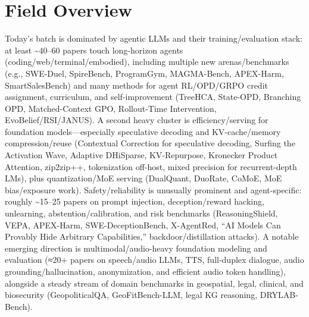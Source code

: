 \documentclass[12pt,letterpaper]{article}
\begin{document}
\section*{Field Overview}
{\footnotesize Today's batch is dominated by agentic LLMs and their training/evaluation stack: at least \textasciitilde{}40--60 papers touch long-horizon agents (coding/web/terminal/embodied), including multiple new arenas/benchmarks (e.g., SWE-Duel, SpireBench, ProgramGym, MAGMA-Bench, APEX-Harm, SmartSalesBench) and many methods for agent RL/OPD/GRPO credit assignment, curriculum, and self-improvement (TreeHCA, State-OPD, Branching OPD, Matched-Context GPO, Rollout-Time Intervention, EvoBelief/RSI/JANUS). A second heavy cluster is efficiency/serving for foundation models---especially speculative decoding and KV-cache/memory compression/reuse (Contextual Correction for speculative decoding, Surfing the Activation Wave, Adaptive DHiSparse, KV-Repurpose, Kronecker Product Attention, zip2zip++, tokenization off-host, mixed precision for recurrent-depth LMs), plus quantization/MoE serving (DualQuant, DuoRate, CoMoE, MoE bias/exposure work). Safety/reliability is unusually prominent and agent-specific: roughly \textasciitilde{}15--25 papers on prompt injection, deception/reward hacking, unlearning, abstention/calibration, and risk benchmarks (ReasoningShield, VEPA, APEX-Harm, SWE-DeceptionBench, X-AgentRed, ``AI Models Can Provably Hide Arbitrary Capabilities,'' backdoor/distillation attacks). A notable emerging direction is multimodal/audio-heavy foundation modeling and evaluation (≈20+ papers on speech/audio LLMs, TTS, full-duplex dialogue, audio grounding/hallucination, anonymization, and efficient audio token handling), alongside a steady stream of domain benchmarks in geospatial, legal, clinical, and biosecurity (GeopoliticalQA, GeoFitBench-LLM, legal KG reasoning, DRYLAB-Bench).}
\end{document}
